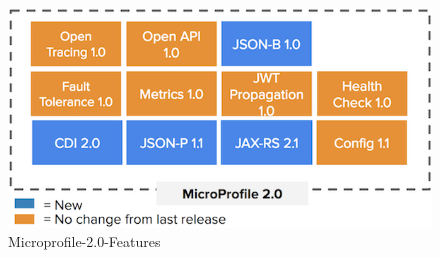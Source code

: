 \begin{figure}[h!]
	\centering
	\includegraphics[width=1.0\linewidth]{images/Microprofile20}
	\caption{Microprofile-2.0-Features \cite{Microprofile.2017}} %
	\label{fig:features2.0}
\end{figure}

\ifCLASSOPTIONcaptionsoff
  \newpage
\fi